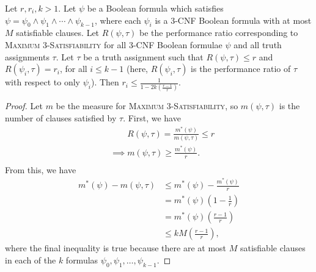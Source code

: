 \documentclass[]{article}
\begin{document}
\begin{lemma}\label{lem:bounds}
  Let $r, r_i, k > 1$.
  Let $\psi$ be a Boolean formula which satisfies $\psi = \psi_0 \land \psi_1 \land \dotsb \land \psi_{k - 1}$, where each $\psi_i$ is a 3-CNF Boolean formula with at most $M$ satisfiable clauses.
  Let $R(\psi, \tau)$ be the performance ratio corresponding to \textsc{Maximum 3-Satisfiability} for all 3-CNF Boolean formulae $\psi$ and all truth assignments $\tau$.
  Let $\tau$ be a truth assignment such that $R(\psi, \tau) \leq r$ and $R(\psi_i, \tau) = r_i$, for all $i \leq k - 1$ (here, $R(\psi_i, \tau)$ is the performance ratio of $\tau$ with respect to only $\psi_i$).
  Then $r_i \leq \frac{1}{1 - 2k\left(\frac{r - 1}{r}\right)}$.
\end{lemma}
\begin{proof}
  Let $m$ be the measure for \textsc{Maximum 3-Satisfiability}, so $m(\psi, \tau)$ is the number of clauses satisfied by $\tau$.
  First, we have
  \begin{align*}
    & \phantom{\implies} R(\psi, \tau) = \frac{m^*(\psi)}{m(\psi, \tau)} \leq r \\
    & \implies m(\psi, \tau) \geq \frac{m^*(\psi)}{r}. \\
  \end{align*}
  From this, we have
  \begin{align*}
    m^*(\psi) - m(\psi, \tau) & \leq m^*(\psi) - \frac{m^*(\psi)}{r} \\
    & = m^*(\psi) \left(1 - \frac{1}{r}\right) \\
    & = m^*(\psi) \left(\frac{r - 1}{r}\right)\\
    & \leq kM \left(\frac{r - 1}{r}\right),
  \end{align*}
  where the final inequality is true because there are at most $M$ satisfiable clauses in each of the $k$ formulas $\psi_0, \psi_1, \dotsc, \psi_{k - 1}$.


\end{proof}
\end{document}
